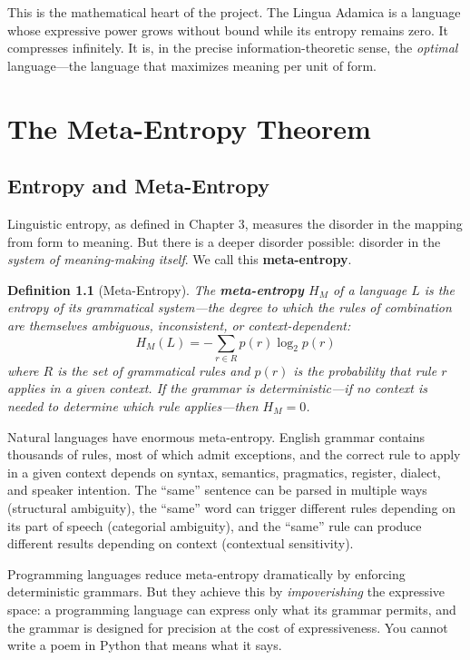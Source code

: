 \documentclass[12pt, letterpaper]{book}
\newtheorem{definition}{Definition}[chapter]
\begin{document}
This is the mathematical heart of the project. The Lingua Adamica is a language whose expressive power grows without bound while its entropy remains zero. It compresses infinitely. It is, in the precise information-theoretic sense, the \textit{optimal} language---the language that maximizes meaning per unit of form.

\chapter{The Meta-Entropy Theorem}

\section{Entropy and Meta-Entropy}

Linguistic entropy, as defined in Chapter 3, measures the disorder in the mapping from form to meaning. But there is a deeper disorder possible: disorder in the \textit{system of meaning-making itself}. We call this \textbf{meta-entropy}.

\begin{definition}[Meta-Entropy]\label{def:meta-entropy}
The \textbf{meta-entropy} $H_M$ of a language $L$ is the entropy of its \textit{grammatical system}---the degree to which the rules of combination are themselves ambiguous, inconsistent, or context-dependent:
\[
H_M(L) = -\sum_{r \in R} p(r) \log_2 p(r)
\]
where $R$ is the set of grammatical rules and $p(r)$ is the probability that rule $r$ applies in a given context. If the grammar is deterministic---if no context is needed to determine which rule applies---then $H_M = 0$.
\end{definition}

Natural languages have enormous meta-entropy. English grammar contains thousands of rules, most of which admit exceptions, and the correct rule to apply in a given context depends on syntax, semantics, pragmatics, register, dialect, and speaker intention. The ``same'' sentence can be parsed in multiple ways (structural ambiguity), the ``same'' word can trigger different rules depending on its part of speech (categorial ambiguity), and the ``same'' rule can produce different results depending on context (contextual sensitivity).

Programming languages reduce meta-entropy dramatically by enforcing deterministic grammars. But they achieve this by \textit{impoverishing} the expressive space: a programming language can express only what its grammar permits, and the grammar is designed for precision at the cost of expressiveness. You cannot write a poem in Python that means what it says.
\end{document}
